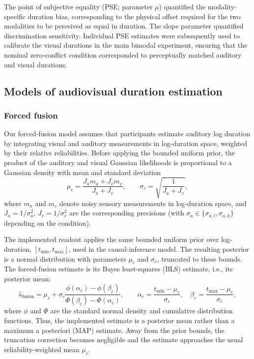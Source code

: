 \documentclass{biorxiv}
\begin{document}
The point of subjective equality (PSE; parameter $\mu$) quantified the modality-specific duration bias, corresponding to the physical offset required for the two modalities to be perceived as equal in duration. The slope parameter quantified discrimination sensitivity. Individual PSE estimates were subsequently used to calibrate the visual durations in the main bimodal experiment, ensuring that the nominal zero-conflict condition corresponded to perceptually matched auditory and visual durations.

\subsection{Models of audiovisual duration estimation}

\subsubsection{Forced fusion}\label{mandatoryFusion}

Our forced-fusion model assumes that participants estimate auditory log duration by integrating visual and auditory measurements in log-duration space, weighted by their relative reliabilities. Before applying the bounded uniform prior, the product of the auditory and visual Gaussian likelihoods is proportional to a Gaussian density with mean and standard deviation
\begin{equation}
\label{eq:forced_fusion}
\mu_c = \frac{J_a m_a + J_v m_v}{J_a + J_v},
\qquad
\sigma_c = \sqrt{\frac{1}{J_a+J_v}},
\end{equation}
where $m_a$ and $m_v$ denote noisy sensory measurements in log-duration space, and $J_a = 1/\sigma_a^2$, $J_v = 1/\sigma_v^2$ are the corresponding precisions (with $\sigma_a \in \{\sigma_{a,l}, \sigma_{a,h}\}$ depending on the condition).

The implemented readout applies the same bounded uniform prior over log-duration, $[t_{\min},t_{\max}]$, used in the causal-inference model. The resulting posterior is a normal distribution with parameters $\mu_c$ and $\sigma_c$, truncated to these bounds. The forced-fusion estimate is its Bayes least-squares (BLS) estimate, i.e., its posterior mean:
\begin{equation}
\hat{s}_{\text{fusion}}
=
\mu_c+\sigma_c
\frac{\phi(\alpha_c)-\phi(\beta_c)}
{\Phi(\beta_c)-\Phi(\alpha_c)},
\qquad
\alpha_c=\frac{t_{\min}-\mu_c}{\sigma_c},
\quad
\beta_c=\frac{t_{\max}-\mu_c}{\sigma_c},
\end{equation}
where $\phi$ and $\Phi$ are the standard normal density and cumulative distribution functions. Thus, the implemented estimate is a posterior mean rather than a maximum a posteriori (MAP) estimate. Away from the prior bounds, the truncation correction becomes negligible and the estimate approaches the usual reliability-weighted mean $\mu_c$.
\end{document}
